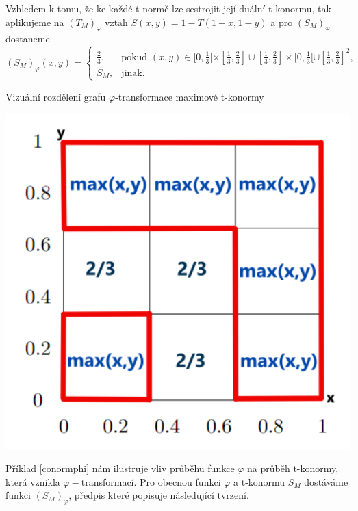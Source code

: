 \begin{example}
    \label{conormphi}
    Vzhledem k tomu, \v ze ke ka\v zd\'e t-norm\v e lze sestrojit jej\'i du\'aln\'i t-konormu, tak aplikujeme na $\left(T_M\right)_\varphi$ vztah $S(x,y)=1-T(1-x,1-y)$ a pro $\left(S_M\right)_\varphi$ dostaneme
 $$(S_M)_\varphi(x,y) = \begin{cases} \frac{2}{3}, & \mbox {pokud } (x,y) \in [0,\frac{1}{3}[\times[\frac{1}{3},\frac{2}{3}] \cup [\frac{1}{3},\frac{2}{3}]\times[0,\frac{1}{3}[ \cup [\frac{1}{3},\frac{2}{3}]^2,
    \\ S_M, & \mbox {jinak. }
    \end{cases}$$
    \begin{graph}Vizu\' aln\' i rozd\v elen\'i grafu $\varphi$-transformace maximové t-konormy
    \label{graph: max-conorm}


\centering
\includegraphics[scale=0.8]{template-fig/phi-t-conorm.pdf}
\end{graph}

\end{example}
Příklad \ref{conormphi} nám ilustruje vliv průběhu funkce $\varphi$ na průběh t-konormy, která vznikla $\varphi-$transformací. Pro obecnou funkci $\varphi$ a t-konormu $S_M$ dostáváme funkci $(S_M)_{\varphi}$, předpis které popisuje následující tvrzení.

